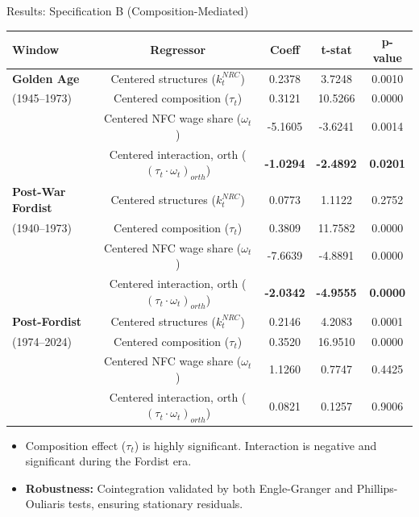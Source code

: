 \documentclass[10pt]{beamer}
\begin{document}
\begin{frame}{Results: Specification B (Composition-Mediated)}
  \begin{table}[htbp]
    \centering
    \scriptsize
    \begin{tabular}{lcccc}
      \toprule
      \textbf{Window} & \textbf{Regressor} & \textbf{Coeff} & \textbf{t-stat} & \textbf{p-value} \\
      \midrule
      \textbf{Golden Age} & Centered structures ($k^{NRC}_t$) & 0.2378 & 3.7248 & 0.0010 \\
      (1945--1973) & Centered composition ($\tau_t$) & 0.3121 & 10.5266 & 0.0000 \\
      & Centered NFC wage share ($\omega_t$) & -5.1605 & -3.6241 & 0.0014 \\
      & Centered interaction, orth ($(\tau_t \cdot \omega_t)_{orth}$) & \textbf{-1.0294} & \textbf{-2.4892} & \textbf{0.0201} \\
      \midrule
      \textbf{Post-War Fordist} & Centered structures ($k^{NRC}_t$) & 0.0773 & 1.1122 & 0.2752 \\
      (1940--1973) & Centered composition ($\tau_t$) & 0.3809 & 11.7582 & 0.0000 \\
      & Centered NFC wage share ($\omega_t$) & -7.6639 & -4.8891 & 0.0000 \\
      & Centered interaction, orth ($(\tau_t \cdot \omega_t)_{orth}$) & \textbf{-2.0342} & \textbf{-4.9555} & \textbf{0.0000} \\
      \midrule
      \textbf{Post-Fordist} & Centered structures ($k^{NRC}_t$) & 0.2146 & 4.2083 & 0.0001 \\
      (1974--2024) & Centered composition ($\tau_t$) & 0.3520 & 16.9510 & 0.0000 \\
      & Centered NFC wage share ($\omega_t$) & 1.1260 & 0.7747 & 0.4425 \\
      & Centered interaction, orth ($(\tau_t \cdot \omega_t)_{orth}$) & 0.0821 & 0.1257 & 0.9006 \\
      \bottomrule
    \end{tabular}
  \end{table}
  \begin{itemize}
    \item Composition effect ($\tau_t$) is highly significant. Interaction is negative and significant during the Fordist era.
    \item \textbf{Robustness:} Cointegration validated by both Engle-Granger and Phillips-Ouliaris tests, ensuring stationary residuals.
  \end{itemize}
\end{frame}
\end{document}
